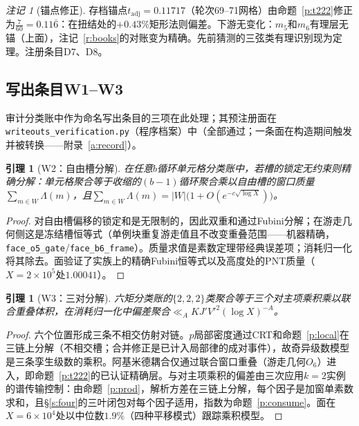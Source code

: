 \documentclass[11pt]{article}
\numberwithin{equation}{section}
\newtheorem{lemma}[theorem]{引理}
\theoremstyle{definition}
\theoremstyle{remark}
\newtheorem{remark}[theorem]{注记}
\newcommand{\LL}{\Lambda}
\begin{document}
\begin{remark}[锚点修正]\label{r:anchor}
存档锚点$t_{\mathrm{adj}}=0.11717$（轮次69--71网格）由命题~\ref{p:t222}修正为$\tfrac7{60}=0.11\overline{6}$：在扭结处的$+0.43\%$矩形法则偏差。下游无变化：$m_5$和$m_6$有理层无锚（上面），注记~\ref{r:books}的对账变为精确。先前猜测的三弦类有理识别现为定理。注册条目D7、D8。
\end{remark}

\subsection{写出条目W1--W3}\label{s:writeouts}

审计分类账中作为命名写出条目的三项在此处理；其预注册面在\texttt{writeouts\_verification.py}（程序档案）中（全部通过；一条面在构造期间触发并被转换——附录~\ref{a:record}）。

\begin{lemma}[W2：自由槽分解]\label{l:W2}
在任意$b$循环单元格分类账中，若槽的锁定无约束则精确分解：单元格聚合等于收缩的$(b-1)$循环聚合乘以自由槽的窗口质量$\sum_{m\in W}\LL(m)$，且$\sum_{m\in W}\LL(m)=|W|\bigl(1+O(e^{-c\sqrt{\log X}})\bigr)$。
\end{lemma}

\begin{proof}
对自由槽偏移的锁定和是无限制的，因此双重和通过Fubini分解；在游走几何侧这是冻结槽恒等式（单例块重复游走值且不改变重叠范围——机器精确，\texttt{face\_o5\_gate}/\texttt{face\_b6\_frame}）。质量求值是素数定理带经典误差项\cite[\S18]{Dav}；消耗归一化将其除去。面验证了实族上的精确Fubini恒等式以及高度处的PNT质量（$X=2\times10^{5}$处$1.00041$）。
\end{proof}

\begin{lemma}[W3：三对分解]\label{l:W3}
六矩分类账的$\{2,2,2\}$类聚合等于三个对主项乘积乘以联合重叠体积，在消耗归一化中偏差聚合$\ll_A KJ'V'^2(\log X)^{-A}$。
\end{lemma}

\begin{proof}
六个位置形成三条不相交仿射对链。$p$局部密度通过CRT和命题~\ref{p:local}在三链上分解（不相交槽；合并修正是已计入局部律的成对事件），故奇异级数模型是三条孪生级数的乘积。阿基米德耦合仅通过联合窗口重叠（游走几何$O_6$）进入，即命题~\ref{p:t222}的已认证精确层。与对主项乘积的偏差由三次应用$k=2$实例的谱传输控制：由命题~\ref{p:prod}，解析方差在三链上分解，每个因子是加窗单素数求和，且\S\ref{s:four}的三叶闭包对每个因子适用，指数为命题~\ref{p:consume}。面在$X=6\times10^{4}$处以中位数$1.9\%$（四种平移模式）跟踪乘积模型。
\end{proof}
\end{document}
